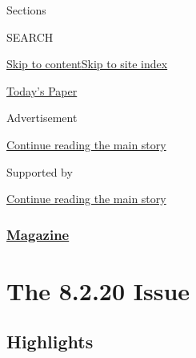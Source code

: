 Sections

SEARCH

\protect\hyperlink{site-content}{Skip to
content}\protect\hyperlink{site-index}{Skip to site index}

\href{https://myaccount.nytimes.com/auth/login?response_type=cookie\&client_id=vi}{}

\href{https://www.nytimes.com/section/todayspaper}{Today's Paper}

Advertisement

\protect\hyperlink{after-top}{Continue reading the main story}

Supported by

\protect\hyperlink{after-sponsor}{Continue reading the main story}

\hypertarget{magazine}{%
\subsubsection{\texorpdfstring{\href{/section/magazine}{Magazine}}{Magazine}}\label{magazine}}

\hypertarget{the-8220-issue}{%
\section{The 8.2.20 Issue}\label{the-8220-issue}}

\hypertarget{highlights}{%
\subsection{Highlights}\label{highlights}}

